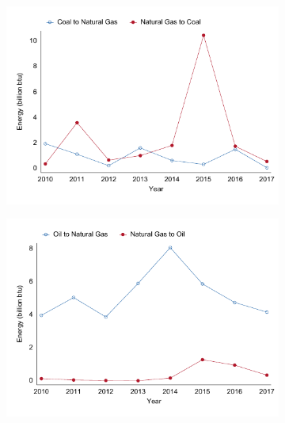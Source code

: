 \documentclass[12pt,notitlepage]{article}
\begin{document}
\begin{figure}[!htpb]
\centering
\caption{Quantity Shares (mmbtu)}
\begin{subfigure}{.49\textwidth}
    \centering
 \includegraphics[scale=0.8]{../Output/Graphs/SwitchCoalNatgas_year.pdf}
\end{subfigure}%
\begin{subfigure}{.49\textwidth}
    \centering
 \includegraphics[scale=0.8]{../Output/Graphs/SwitchOilNatgas_year.pdf}
\end{subfigure}
\begin{subfigure}{.49\textwidth}
    \centering

\end{subfigure}
\end{figure}
\end{document}
